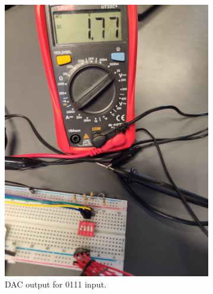 \begin{figure}[H]
\begin{subfigure}[]{0.3\textwidth}
\includegraphics[width=\linewidth]{./Figures/DAC_Prac_0111.jpeg}
\caption{DAC output for 0111 input.}
\label{subfig:dac_prac_0111}	
\end{subfigure}
\hfill
\begin{subfigure}[]{0.3\textwidth}

\end{subfigure}
\end{figure}
